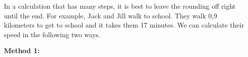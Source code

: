         
        \label{m30853*id64160}In a calculation that has many steps, it is best to leave the rounding off right until the end.
For example, Jack and Jill walk to school. They walk 0,9 kilometers to get to school and it takes them 17 minutes. We can calculate their speed in the following two ways.\par 
        \label{m30853*id64166}\textbf{Method 1:}
          \label{m30853*id64177}\nopagebreak\noindent{}
    
          
          
